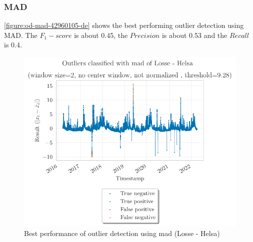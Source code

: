 \subsubsection{MAD}
\autoref{figure:od-mad-42960105-de} shows the best performing outlier detection using \ac{MAD}. The $F_1-score$ is about 0.45, the $Precision$ is about 0.53 and the $Recall$ is 0.4. 
\begin{figure}[htp]
    \centering 
    \includegraphics{plots/pdfs/42960105-de/od_mad_42960105-de_all.pdf}
    \caption{Best performance of outlier detection using mad (Losse - Helsa)}
    \label{figure:od-mad-42960105-de}
\end{figure}

